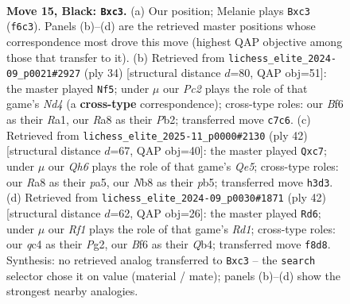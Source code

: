 \documentclass[11pt]{article}
\begin{document}
\clearpage

\begin{figure}[p]\centering
\begin{subfigure}{0.46\textwidth}\centering
\resizebox{\linewidth}{!}{%
\newchessgame
\chessboard[
  setfen={rn3rk1/p1p1pp1p/5bp1/2BP4/2Q1P3/2P4q/P4P1P/R4RK1 b - - 1 15},
  showmover=false,
  pgfstyle=straightmove, color=movearrow, markmove={f6-c3}
]}
\caption{}
\end{subfigure}\hfill
\begin{subfigure}{0.46\textwidth}\centering
\resizebox{\linewidth}{!}{%
\newchessgame
\chessboard[
  setfen={r2r2k1/ppQnbpp1/q6p/3p4/3N4/3PB1P1/PP3P1P/R4RK1 w - - 2 18},
  showmover=false,
  pgfstyle=straightmove, color=movearrow, markmove={d4-f5}
]}
\caption{}
\end{subfigure}
\\[4pt]
\begin{subfigure}{0.46\textwidth}\centering
\resizebox{\linewidth}{!}{%
\newchessgame
\chessboard[
  setfen={2rr2k1/1bq2ppp/2p1p3/ppP1Q3/3P4/3R2P1/PP3PBP/3R2K1 w - - 0 22},
  showmover=false,
  pgfstyle=straightmove, color=movearrow, markmove={e5-c7}
]}
\caption{}
\end{subfigure}\hfill
\begin{subfigure}{0.46\textwidth}\centering
\resizebox{\linewidth}{!}{%
\newchessgame
\chessboard[
  setfen={r1r3k1/ppq3pp/4bp2/4p3/1Q2p3/P1P1P1BP/5PP1/R2R2K1 w - - 0 22},
  showmover=false,
  pgfstyle=straightmove, color=movearrow, markmove={d1-d6}
]}
\caption{}
\end{subfigure}
\caption{\textbf{Move 15, Black: \texttt{Bxc3}.} (a) Our position; Melanie plays \texttt{Bxc3} (\texttt{f6c3}). Panels (b)--(d) are the retrieved master positions whose correspondence most drove this move (highest QAP objective among those that transfer to it). (b) Retrieved from \texttt{lichess\_elite\_2024-09\_p0021\#2927} (ply 34) [structural distance $d$=80, QAP obj=51]: the master played \texttt{Nf5}; under $\mu$ our \emph{Pc2} plays the role of that game's \emph{Nd4} (a \textbf{cross-type} correspondence); cross-type roles: our \emph{B}f6 as their \emph{R}a1, our \emph{R}a8 as their \emph{P}b2; transferred move \texttt{c7c6}. (c) Retrieved from \texttt{lichess\_elite\_2025-11\_p0000\#2130} (ply 42) [structural distance $d$=67, QAP obj=40]: the master played \texttt{Qxc7}; under $\mu$ our \emph{Qh6} plays the role of that game's \emph{Qe5}; cross-type roles: our \emph{R}a8 as their \emph{p}a5, our \emph{N}b8 as their \emph{p}b5; transferred move \texttt{h3d3}. (d) Retrieved from \texttt{lichess\_elite\_2024-09\_p0030\#1871} (ply 42) [structural distance $d$=62, QAP obj=26]: the master played \texttt{Rd6}; under $\mu$ our \emph{Rf1} plays the role of that game's \emph{Rd1}; cross-type roles: our \emph{q}c4 as their \emph{P}g2, our \emph{B}f6 as their \emph{Q}b4; transferred move \texttt{f8d8}. Synthesis: no retrieved analog transferred to \texttt{Bxc3} -- the \texttt{search} selector chose it on value (material / mate); panels (b)--(d) show the strongest nearby analogies.}
\label{fig:thought-m29}
\end{figure}
\end{document}
